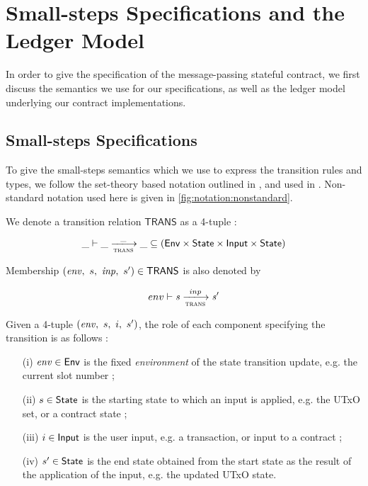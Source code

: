 \section{Small-steps Specifications and the Ledger Model}
\label{sec:sts}

In order to give the specification of the message-passing stateful contract,
we first discuss the semantics we use for our specifications, as well as the
ledger model underlying our contract implementations.

\subsection{Small-steps Specifications}

To give the small-steps semantics which we use to express the transition
rules and types, we follow the set-theory based notation
outlined in \cite{steps}, and used in \cite{alonzo} \cite{structured}.
Non-standard notation used here is given in \ref{fig:notation:nonstandard}.

We denote a transition relation $\mathsf{TRANS}$ as a 4-tuple :

  \begin{equation*}
    \_ \vdash
    \var{\_} \trans{trans}{\_} \var{\_}
    \subseteq (\Env \times \State \times \Input \times \State)
  \end{equation*}

Membership $(\mathit{env},~s,~\mathit{inp},~s') \in \mathsf{TRANS}$ is also denoted by

  \begin{equation*}
    env \vdash
    \var{s} \trans{trans}{inp} \var{s'}
  \end{equation*}

Given a 4-tuple $(\mathit{env},~s,~i,~s')$, the role of each component
specifying the transition is as follows :

\begin{itemize}
  \item[(i)] $\mathit{env} \in \mathsf{Env}$ is the fixed \emph{environment} of the state transition
  update, e.g. the current slot number ;

  \item[(ii)] $s \in \mathsf{State}$ is the starting state
  to which an input is applied, e.g. the UTxO set, or a contract state ;

  \item[(iii)] $i \in \textsf{Input}$ is the user input, e.g. a transaction, or input to
  a contract ;

  \item[(iv)] $s' \in \mathsf{State}$ is the end state
  obtained from the start state as the result of the application of the input,
  e.g. the updated UTxO state.
\end{itemize}

